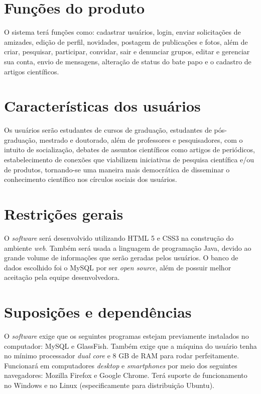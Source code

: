 \section{Funções do produto}

O sistema terá funções como: cadastrar usuários, login, enviar solicitações de amizades, edição de perfil, novidades, postagem de publicações e fotos, além de criar, pesquisar, participar, convidar, sair e denunciar grupos, editar e gerenciar sua conta, envio de mensagens, alteração de status do bate papo e o cadastro de artigos científicos.

\section{Características dos usuários}
Os usuários serão estudantes de cursos de graduação, estudantes de pós-graduação, mestrado e doutorado, além de professores e pesquisadores, com o intuito de socialização, debates de assuntos científicos como artigos de periódicos, estabelecimento de conexões que viabilizem iniciativas de pesquisa científica e/ou de produtos, tornando-se uma maneira mais democrática de disseminar o conhecimento científico nos círculos sociais dos usuários.


\section{Restrições gerais}
O \textit{software} será desenvolvido utilizando HTML 5 e CSS3 na construção do ambiente \textit{web}. Também será usada a linguagem de programação Java, devido ao grande volume de informações que serão geradas pelos usuários. O banco de dados escolhido foi o MySQL por ser \textit{open source}, além de possuir melhor aceitação pela equipe desenvolvedora.

\section{Suposições e dependências}
O \textit{software} exige que os seguintes programas estejam previamente instalados no computador: MySQL e GlassFish. Também exige que a máquina do usuário tenha no mínimo processador \textit{dual core} e 8 GB de RAM para rodar perfeitamente. Funcionará em computadores \textit{desktop} e \textit{smartphones} por meio dos seguintes navegadores: Mozilla Firefox e Google Chrome. Terá suporte de funcionamento no Windows e no Linux (especificamente para distribuição Ubuntu).